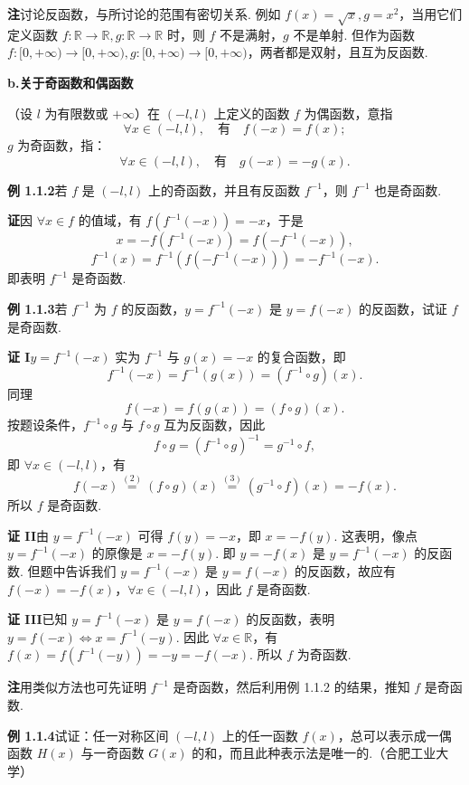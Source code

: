 \documentclass[UTF8,12pt,a4paper,fontset=fandol]{ctexart}
\begin{document}
\noindent\textbf{注}\quad 讨论反函数，与所讨论的范围有密切关系. 例如 $f(x)=\sqrt{x},g=x^2$，当用它们定义函数 $f:\mathbb{R}\to\mathbb{R},g:\mathbb{R}\to\mathbb{R}$ 时，则 $f$ 不是满射，$g$ 不是单射. 但作为函数 $f:[0,+\infty)\to[0,+\infty),g:[0,+\infty)\to[0,+\infty)$，两者都是双射，且互为反函数.

\noindent\textbf{b.\quad 关于奇函数和偶函数}

（设 $l$ 为有限数或 $+\infty$）在 $(-l,l)$ 上定义的函数 $f$ 为偶函数，意指
\[
  \forall x\in(-l,l),\quad \text{有}\quad f(-x)=f(x);
\]
$g$ 为奇函数，指：
\[
  \forall x\in(-l,l),\quad \text{有}\quad g(-x)=-g(x).
\]

\noindent\textbf{例 1.1.2}\quad 若 $f$ 是 $(-l,l)$ 上的奇函数，并且有反函数 $f^{-1}$，则 $f^{-1}$ 也是奇函数.

\noindent\textbf{证}\quad 因 $\forall x\in f$ 的值域，有 $f(f^{-1}(-x))=-x$，于是
\[
  x=-f(f^{-1}(-x))=f(-f^{-1}(-x)),
\]
\[
  f^{-1}(x)=f^{-1}(f(-f^{-1}(-x)))=-f^{-1}(-x).
\]
即表明 $f^{-1}$ 是奇函数.

\noindent\textbf{例 1.1.3}\quad 若 $f^{-1}$ 为 $f$ 的反函数，$y=f^{-1}(-x)$ 是 $y=f(-x)$ 的反函数，试证 $f$ 是奇函数.

\noindent\textbf{证 I}\quad $y=f^{-1}(-x)$ 实为 $f^{-1}$ 与 $g(x)=-x$ 的复合函数，即
\[
  f^{-1}(-x)=f^{-1}(g(x))=(f^{-1}\circ g)(x).
\tag{1}
\]
同理
\[
  f(-x)=f(g(x))=(f\circ g)(x).
\tag{2}
\]
按题设条件，$f^{-1}\circ g$ 与 $f\circ g$ 互为反函数，因此
\[
  f\circ g=(f^{-1}\circ g)^{-1}=g^{-1}\circ f,
\tag{3}
\]
即 $\forall x\in(-l,l)$，有
\[
  f(-x)\stackrel{(2)}{=}(f\circ g)(x)\stackrel{(3)}{=}(g^{-1}\circ f)(x)=-f(x).
\]
所以 $f$ 是奇函数.

\noindent\textbf{证 II}\quad 由 $y=f^{-1}(-x)$ 可得 $f(y)=-x$，即 $x=-f(y)$. 这表明，像点 $y=f^{-1}(-x)$ 的原像是 $x=-f(y)$. 即 $y=-f(x)$ 是 $y=f^{-1}(-x)$ 的反函数. 但题中告诉我们 $y=f^{-1}(-x)$ 是 $y=f(-x)$ 的反函数，故应有 $f(-x)=-f(x)$，$\forall x\in(-l,l)$，因此 $f$ 是奇函数.

\noindent\textbf{证 III}\quad 已知 $y=f^{-1}(-x)$ 是 $y=f(-x)$ 的反函数，表明 $y=f(-x)\Leftrightarrow x=f^{-1}(-y)$. 因此 $\forall x\in\mathbb{R}$，有 $f(x)=f(f^{-1}(-y))=-y=-f(-x)$. 所以 $f$ 为奇函数.

\noindent\textbf{注}\quad 用类似方法也可先证明 $f^{-1}$ 是奇函数，然后利用例 1.1.2 的结果，推知 $f$ 是奇函数.

\noindent\textbf{例 1.1.4}\quad 试证：任一对称区间 $(-l,l)$ 上的任一函数 $f(x)$，总可以表示成一偶函数 $H(x)$ 与一奇函数 $G(x)$ 的和，而且此种表示法是唯一的.（合肥工业大学）
\end{document}
